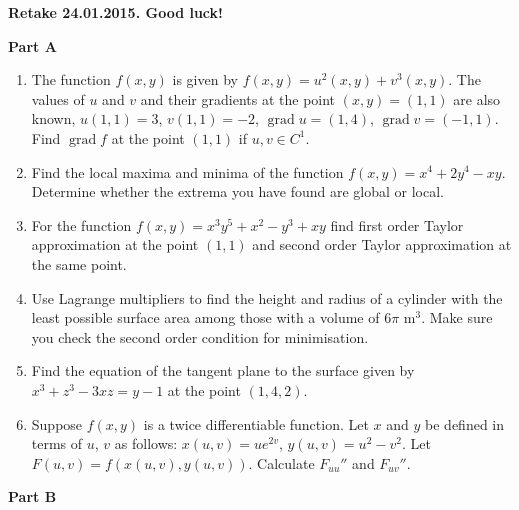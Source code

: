 \documentclass[12pt,a4paper]{article}
\DeclareMathOperator{\grad}{grad}
\begin{document}
\thispagestyle{empty}
\textbf{Retake 24.01.2015. Good luck!}

\textbf{Part A}

\begin{enumerate}

\item The function $f(x,y)$ is given by $f(x,y)=u^2(x,y)+v^3(x,y)$. The values of $u$ and $v$ and their gradients at the point $(x,y)=(1,1)$ are also known, $u(1,1)=3$, $v(1,1)=-2$, $\grad u=(1,4)$, $\grad v=(-1,1)$. Find $\grad f$ at the point $(1,1)$ if $u,v \in C^1$.

\item Find the local maxima and minima of the function $f(x,y)=x^4+2y^4-xy$. Determine whether the extrema you have found are global or local.

\item For the function $f(x,y)=x^3y^5+x^2-y^3+xy$ find first order Taylor approximation at the point $(1,1)$ and second order Taylor approximation at the same point.

\item Use Lagrange multipliers to find the height and radius of a cylinder with the least possible
surface area among those with a volume of $6\pi$ m$^3$. Make sure you check the second order
condition for minimisation.

\item Find the equation of the tangent plane to the surface given by $x^3+z^3-3xz=y-1$ at the point $(1, 4, 2)$.

\item Suppose $f(x,y)$ is a twice differentiable function. Let $x$ and $y$ be defined in terms of $u$, $v$ as follows: $x(u,v)=ue^{2v}$, $y(u,v)=u^2-v^2$. Let $F(u,v)=f(x(u, v), y(u, v))$.
Calculate $F_{uu}''$ and $F_{uv}''$.

\end{enumerate}

\textbf{Part B}
\end{document}
